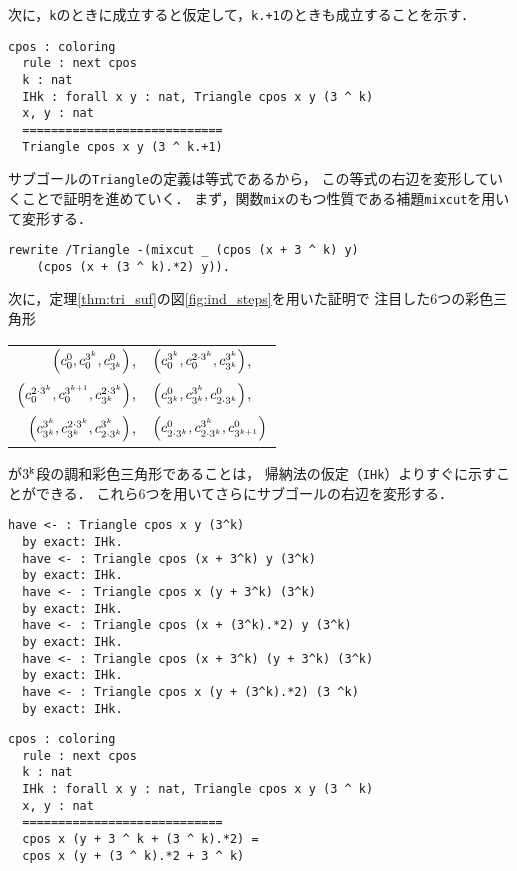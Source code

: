 次に，{\tt{k}}のときに成立すると仮定して，{\tt{k.+1}}のときも成立することを示す．
\begin{lstlisting}[language=Coq]
  cpos : coloring
  rule : next cpos
  k : nat
  IHk : forall x y : nat, Triangle cpos x y (3 ^ k)
  x, y : nat
  ============================
  Triangle cpos x y (3 ^ k.+1)
\end{lstlisting}
サブゴールの{\tt{Triangle}}の定義は等式であるから，
この等式の右辺を変形していくことで証明を進めていく．
まず，関数{\tt{mix}}のもつ性質である補題{\tt{mixcut}}を用いて変形する．
\begin{lstlisting}[language=Coq]
  rewrite /Triangle -(mixcut _ (cpos (x + 3 ^ k) y)
    (cpos (x + (3 ^ k).*2) y)).
\end{lstlisting}
次に，定理\ref{thm:tri_suf}の図\ref{fig:ind_steps}を用いた証明で
注目した6つの彩色三角形
\begin{center}
  \begin{tabular}{rl}
    $\left(c^{0}_{0},c^{3^{k}}_{0},c^{0}_{3^{k}}\right)$,
    &
    $\left(c^{3^{k}}_{0},c^{2\cdot3^{k}}_{0},c^{3^{k}}_{3^{k}}\right)$,
    \\
    $\left(c^{2\cdot3^{k}}_{0},c^{3^{k+1}}_{0},c^{2\cdot3^{k}}_{3^{k}}\right)$,
    &
    $\left(c^{0}_{3^{k}},c^{3^{k}}_{3^{k}},c^{0}_{2\cdot3^{k}}\right)$,
    \\
    $\left(c^{3^{k}}_{3^{k}},c^{2\cdot3^{k}}_{3^{k}},c^{3^{k}}_{2\cdot3^{k}}\right)$,
    &
    $\left(c^{0}_{2\cdot3^{k}},c^{3^{k}}_{2\cdot3^{k}},c^{0}_{3^{k+1}}\right)$
  \end{tabular}
\end{center}
が$3^{\tt{k}}$段の調和彩色三角形であることは，
帰納法の仮定（{\tt{IHk}}）よりすぐに示すことができる．
これら6つを用いてさらにサブゴールの右辺を変形する．
\begin{lstlisting}[language=Coq]
  have <- : Triangle cpos x y (3^k)
  by exact: IHk.
  have <- : Triangle cpos (x + 3^k) y (3^k)
  by exact: IHk.
  have <- : Triangle cpos x (y + 3^k) (3^k)
  by exact: IHk.
  have <- : Triangle cpos (x + (3^k).*2) y (3^k)
  by exact: IHk.
  have <- : Triangle cpos (x + 3^k) (y + 3^k) (3^k)
  by exact: IHk. 
  have <- : Triangle cpos x (y + (3^k).*2) (3 ^k)
  by exact: IHk.
\end{lstlisting}
\begin{lstlisting}[language=Coq]
  cpos : coloring
  rule : next cpos
  k : nat
  IHk : forall x y : nat, Triangle cpos x y (3 ^ k)
  x, y : nat
  ============================
  cpos x (y + 3 ^ k + (3 ^ k).*2) =
  cpos x (y + (3 ^ k).*2 + 3 ^ k)
\end{lstlisting}
